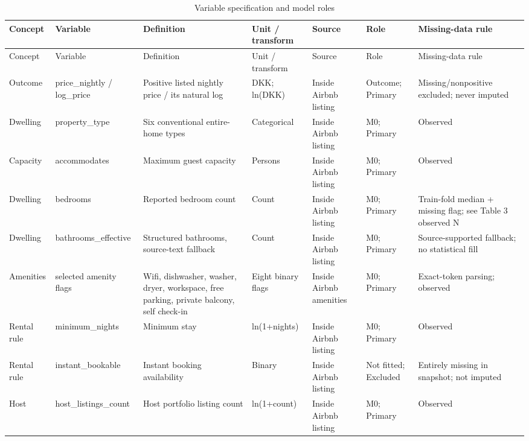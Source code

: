 \begin{landscape}
\small
\begin{longtable}{>{\raggedright\arraybackslash}p{2.5cm}>{\raggedright\arraybackslash}p{3.0cm}>{\raggedright\arraybackslash}p{5.0cm}>{\raggedright\arraybackslash}p{2.7cm}>{\raggedright\arraybackslash}p{2.5cm}>{\raggedright\arraybackslash}p{3.1cm}>{\raggedright\arraybackslash}p{3.7cm}}
\caption{Variable specification and model roles}\label{tab:variables}\\
\toprule
Concept & Variable & Definition & Unit / transform & Source & Role & Missing-data rule \\
\midrule
\endfirsthead
\toprule
Concept & Variable & Definition & Unit / transform & Source & Role & Missing-data rule \\
\midrule
\endhead
Outcome & price\_\allowbreak{}nightly / log\_\allowbreak{}price & Positive listed nightly price / its natural log & DKK; ln(DKK) & Inside Airbnb listing & Outcome; Primary & Missing/nonpositive excluded; never imputed \\
Dwelling & property\_\allowbreak{}type & Six conventional entire-home types & Categorical & Inside Airbnb listing & M0; Primary & Observed \\
Capacity & accommodates & Maximum guest capacity & Persons & Inside Airbnb listing & M0; Primary & Observed \\
Dwelling & bedrooms & Reported bedroom count & Count & Inside Airbnb listing & M0; Primary & Train-fold median + missing flag; see Table 3 observed N \\
Dwelling & bathrooms\_\allowbreak{}effective & Structured bathrooms, source-text fallback & Count & Inside Airbnb listing & M0; Primary & Source-supported fallback; no statistical fill \\
Amenities & 8 selected amenity flags & Wifi, dishwasher, washer, dryer, workspace, free parking, private balcony, self check-in & Eight binary flags & Inside Airbnb amenities & M0; Primary & Exact-token parsing; observed \\
Rental rule & minimum\_\allowbreak{}nights & Minimum stay & ln(1+nights) & Inside Airbnb listing & M0; Primary & Observed \\
Rental rule & instant\_\allowbreak{}bookable & Instant booking availability & Binary & Inside Airbnb listing & Not fitted; Excluded & Entirely missing in snapshot; not imputed \\
Host & host\_\allowbreak{}listings\_\allowbreak{}count & Host portfolio listing count & ln(1+count) & Inside Airbnb listing & M0; Primary & Observed \\

\end{longtable}
\end{landscape}
